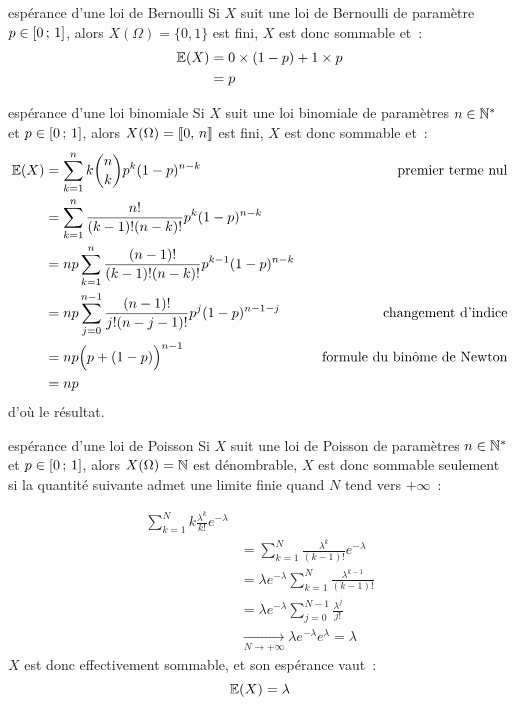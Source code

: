 \begin{exemple}{}{espérance d'une loi de Bernoulli}
    Si $X$ suit une loi de Bernoulli de paramètre $p \in [0\, ; \, 1]$, alors $X(\Omega) = \{0, 1\}$ est fini, $X$ est donc sommable et~:
    \begin{align*}
        \mathbb{E}(X) &= 0 \times (1-p) + 1 \times p \\
        &= p
    \end{align*}
\end{exemple}

\begin{exemple}{}{espérance d'une loi binomiale}
    Si $X$ suit une loi binomiale de paramètres $n \in \mathbb{N}^*$ et $p \in [0\, ; \, 1]$, alors $X(\Omega) = \llbracket 0 ,\, n \rrbracket$ est fini, $X$ est donc sommable et~:
    \begin{align*}
        \mathbb{E}(X) &= \sum_{k=1}^n k \binom{n}{k} p^k (1-p)^{n-k} \qquad &\text{premier terme nul}\\
        &= \sum_{k=1}^n \frac{n!}{(k-1)!(n-k)!} p^k (1-p)^{n-k} \\
        &= np \sum_{k=1}^n \frac{(n-1)!}{(k-1)!(n-k)!} p^{k-1} (1-p)^{n-k} \\
        &= np \sum_{j=0}^{n-1} \frac{(n-1)!}{j!(n-j-1)!} p^j (1-p)^{n-1-j}\qquad &\text{changement d'indice}\\
        &= np \Big(p + (1-p)\Big)^{n-1} \qquad &\text{formule du binôme de Newton}\\
        &= np
    \end{align*}
    d'où le résultat.
\end{exemple}

\begin{exemple}{}{espérance d'une loi de Poisson}
    Si $X$ suit une loi de Poisson de paramètres $n \in \mathbb{N}^*$ et $p \in [0\, ; \, 1]$, alors $X(\Omega) = \mathbb{N}$ est dénombrable, $X$ est donc sommable seulement si la quantité suivante admet une limite finie quand $N$ tend vers $+\infty$~:

    \begin{align*}
        \sum_{k=1}^N k \frac{\lambda^k}{k!}e^{-\lambda}\\
        &= \sum_{k=1}^N \frac{\lambda^k}{(k-1)!}e^{-\lambda}\\
        &= \lambda e^{-\lambda} \sum_{k=1}^N \frac{\lambda^{k-1}}{(k-1)!}\\
        &= \lambda e^{-\lambda} \sum_{j=0}^{N-1} \frac{\lambda^j}{j!}\\
        &\xrightarrow[N \to +\infty]{} \lambda e^{-\lambda} e^{\lambda} = \lambda
    \end{align*}
    $X$ est donc effectivement sommable, et son espérance vaut~:
    $$\mathbb{E}(X) = \lambda$$
\end{exemple}

